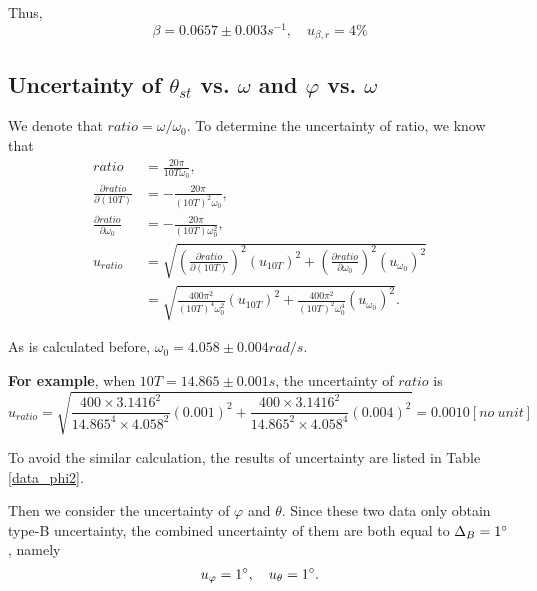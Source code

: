 Thus, 
\[
\beta=0.0657\pm 0.003s^{-1}, \quad u_{\beta,r}=4\%
\]



\subsection{Uncertainty of $\theta_{st}$ vs. $\omega$ and $\varphi$ vs. $\omega$}
    We denote that $ratio=\omega/\omega_0$. To determine the uncertainty of ratio, we know that
    \[
    \begin{split}
        ratio&=\frac{20\pi}{10T\omega_0},\\
        \frac{\partial ratio}{\partial (10T)}&=-\frac{20\pi}{(10T)^2\omega_0},\\
        \frac{\partial ratio}{\partial \omega_0}&=-\frac{20\pi}{(10T)\omega_0^2},\\
        u_{ratio}&=\sqrt{(\frac{\partial ratio}{\partial (10T)})^2(u_{10T})^2+(\frac{\partial ratio}{\partial \omega_0})^2(u_{\omega_0})^2}\\
        &=\sqrt{\frac{400\pi^2}{(10T)^4\omega_0^2}(u_{10T})^2+\frac{400\pi^2}{(10T)^2\omega_0^4}(u_{\omega_0})^2}.
    \end{split}
    \]

    As is calculated before, $\omega_0=4.058\pm 0.004rad/s$.

    \textbf{For example}, when $10T=14.865\pm 0.001s$, the uncertainty of $ratio$ is
    \[
        u_{ratio}=\sqrt{\frac{400\times3.1416^2}{14.865^4\times4.058^2}(0.001)^2+\frac{400\times3.1416^2}{14.865^2\times4.058^4}(0.004)^2}=0.0010[no\ unit]
    \]

    To avoid the similar calculation, the results of uncertainty are listed in Table \ref{data_phi2}.

    Then we consider the uncertainty of $\varphi$ and $\theta$. Since these two data only obtain type-B uncertainty, the combined uncertainty of them are both equal to $\Delta_B=1^\circ$, namely
    \[
        u_{\varphi}=1^\circ, \quad u_{\theta}=1^\circ.
    \]